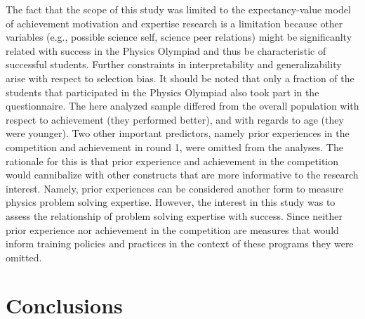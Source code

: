 \documentclass[D:/studies/WinnerS/Erhebungen/IPhO1718/paper/problem_solving/main/TaylorFrancis/interactapasample]{subfiles}
\begin{document}
The fact that the scope of this study was limited to the expectancy-value model of achievement motivation and expertise research is a limitation because other variables (e.g., possible science self, science peer relations) might be significanlty related with success in the Physics Olympiad and thus be characteristic of successful students. Further constraints in interpretability and generalizability arise with respect to selection bias. It should be noted that only a fraction of the students that participated in the Physics Olympiad also took part in the questionnaire. The here analyzed sample differed from the overall population with respect to achievement (they performed better), and with regards to age (they were younger). Two other important predictors, namely prior experiences in the competition and achievement in round 1, were omitted from the analyses. The rationale for this is that prior experience and achievement in the competition would cannibalize with other constructs that are more informative to the research interest. Namely, prior experiences can be considered another form to measure physics problem solving expertise. However, the interest in this study was to assess the relationship of problem solving expertise with success. Since neither prior experience nor achievement in the competition are measures that would inform training policies and practices in the context of these programs they were omitted.


\section{Conclusions}
\end{document}
